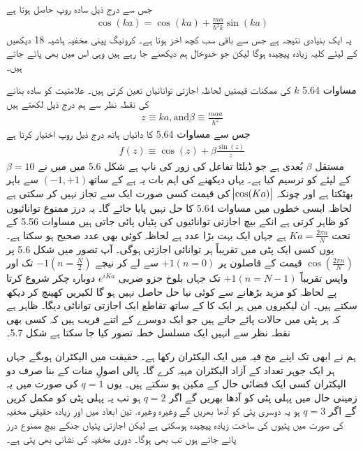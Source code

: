 \documentclass[leqno, b5paper]{khalid-urdu-book}
\begin{document}
جس سے درج ذیل سادہ روپ حاصل ہوتا ہے
\begin{align}
	\cos(ka) = \cos(ka) + \frac{m\alpha}{\hbar^{2}k}\sin(ka)
\end{align}
یہ ایک بنیادی نتیجہ ہے جس سے باقی سب کچھ اخز ہوتا ہے۔ کرونیگ پینی مخفیہ ہاشیہ \num{18} دیکھیں کے لیئے کلیہ زیادہ پیچیدہ ہوگا لیکن جو خدوخال ہم دیکھنے جا رہے ہیں وہی اس میں بھی پائے جاتے ہیں۔

 مساوات \num{5.64} $k$ کی ممکنات قیمتیں لحاظہ اجازتی توانائیاں تعین کرتی ہیں۔ علامتیت کو سادہ بنانے کی نقطہ نظر سے ہم درج ذیل لکھتے ہیں 
\begin{align}
	z \equiv ka, \text{and} \beta \equiv \frac{m\alpha a}{\hbar^{2}}
\end{align}
جس سے مساوات \num{5.64} کا دائیاں ہاتھ درج ذیل روپ اختیار کرتا ہے
\begin{align}
	f(z) \equiv \cos(z) + \beta\frac{\sin(z)}{z}
\end{align}
مستقل $\beta$ بُعدی ہے جو ڈیلٹا تفاعل کی زور کی ناپ ہے شکل \num{5.6} میں میں نے \(\beta = 10\) کے لیئے  کو ترسیم کیا ہے۔ یہاں دیکھنے کی اہم بات یہ ہے کے ساتھ\((-1, +1)\) سے باہر بھٹکتا ہے اور چونکہ \(\abs{\cos(Ka)}\) کی قیمت کسی صورت ایک سے تجاز نہیں کر سکتی ہے لحاظہ ایسی خطوں میں مساوات \num{5.64} کا حل نہیں پایا جائے گا۔ یہ درز ممنوع توانائیوں کو ظاہر کرتی ہے انکے بیچ اجازتی توانائیوں کی پٹیاں پائی جاتی ہیں مساوات \num{5.56} کے تحت \(Ka = \frac{2\pi n}{N}\) ہے جہاں  ایک بہت بڑا عدد ہے لحاظہ  کوئی بھی عدد صحیح ہو سکتا ہے۔ یوں کسی ایک پٹی میں تقریباً ہر توانائی اجازتی ہوگی۔ آپ تصور میں شکل \num{5.6} پر \(\cos(\frac{2\pi n}{N})\) قیمت کے فاصلون پر \(+1(n = 0)\) سے لے کر نیچے \(-1(n = \frac{N}{2})\) تک اور واپس تقریباً \(+1(n = N-1)\) تک جہاں بلوخ جزو ضربی \(e^{iKa}\) دوبارہ چکر شروع کرتا پے لحاظہ  کو مزید بڑھانے سے کوئی نیا حل حاصل نہیں ہو گا لکیریں کھینچ کر دیکھ سکتے ہیں۔ ان لیکیروں میں ہر ایک کا  کے ساتھ تقاطع ایک اجازتی توانائی دیگا۔ ظاہر ہے کہ ہر پٹی میں  حالات پائے جاتے ہیں جو ایک دوسرے کے اتنے قریب ہیں  کہ کسی بھی نقطہ نظر سے انہیں ایک مسلسل خطہ تصور کیا جا سکتا ہے شکل \num{5.7}۔

 ہم نے ابھی تک اپنے مخ فیہ میں ایک الیکٹران رکھا ہے۔ حقیقت میں  الیکٹران ہوںگے جہاں ہر ایک جوہر  تعداد کے آزاد الیکٹران مہیہ کرے گا۔ پالی اصولِ منات کے بنا صرف دو الیکٹران کسی ایک فضائی حال کے مکین ہو سکتے ہیں۔ یوں  \(q = 1\) کی صورت میں یہ زمینی حال میں پہلی پٹی کو آدھا  بھریں گے اگر  \(q = 2\) ہو تب یہ پہلی پٹی کو مکمل کریں گے اگر \(q = 3\) ہو یہ دوسری پٹی کو آدھا بھریں گے وغیرہ وغیرہ. تین ابعاد میں اور زیادہ حقیقی مخفیہ کی صورت میں پٹیوں کی ساخت زیادہ پیچیدہ ہوسکتی ہے لیکن اجازتی پٹیاں جنکے بیچ ممنوع درز پائے جاتے ہوں تب بھی ہوگا۔ دوری مخفیہ کی نشانی بھی پٹی ہے۔
 
\end{document}
